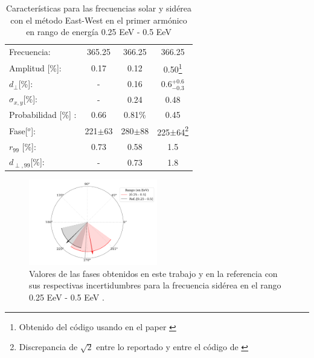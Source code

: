 \begin{table}[H]
    \begin{small}
        \begin{center}
            \begin{tabular}[c]{l|c||c|c}
                Frecuencia:         & 365.25	  & 366.25	   & 366.25 \cite{Aab_2020}   \\
                Amplitud [\%]:      & 0.17	      & 0.12	   & 0.50\footnote[2]{\label{note1}Obtenido del código usando en el paper \cite{Aab_2020}}      \\
                $d_\perp$[\%]:      & -	          & 0.16	   & $0.6^{+0.6}_{-0.3}$       \\
                $\sigma_{x,y}$[\%]: & -	          & 0.24	   & 0.48       \\
                Probabilidad [\%] : & 0.66        & 0.81\%	   & 0.45       \\
                Fase[$^o$]:         & 221$\pm$63  & 280$\pm$88 & 225$\pm$64\footnote[3]{Discrepancia de $\sqrt{2}$ entre lo reportado y entre el código de \cite{Aab_2020}}  	\\
                $r_{99}$ [\%]:      & 0.73	      & 0.58       & 1.5\footnotemark[2]                \\
                $d_{\perp,99}$[\%]: & -           & 0.73       & 1.8      \\
            \end{tabular}
        \end{center}
    \end{small}
    \caption{Características para las frecuencias solar y sidérea con el método East-West en el primer armónico en rango de energía 0.25 EeV - 0.5 EeV}
    \label{tab:solar}
\end{table}

\begin{figure}[H]
    \begin{small}
        \begin{center}
            \includegraphics[width=0.5\textwidth]{phase_primer_bin.pdf}
        \end{center}
        \caption{Valores de las fases obtenidos en este trabajo y en la referencia con sus respectivas incertidumbres para la frecuencia sidérea en el  rango 0.25 EeV - 0.5 EeV .}
        \label{fig:primer}
    \end{small}
\end{figure}

